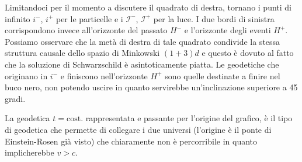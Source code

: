 Limitandoci per il momento a discutere il quadrato di destra, tornano i punti di infinito $i^-$, $i^+$ per le particelle e i $\mathcal{I^-}$, $\mathcal{I}^+$ per la luce. I due bordi di sinistra corrispondono invece all'orizzonte del passato $H^-$ e l'orizzonte degli eventi $H^+$. Possiamo osservare che la metà di destra di tale quadrato condivide la stessa struttura causale dello spazio di Minkowski $(1+3)d$ e questo è dovuto al fatto che la soluzione di Schwarzschild è asintoticamente piatta. Le geodetiche che originano in $i^-$ e finiscono nell'orizzonte $H^+$ sono quelle destinate a finire nel buco nero, non potendo uscire in quanto servirebbe un'inclinazione superiore a 45 gradi.

La geodetica $t=\textrm{cost.}$ rappresentata e passante per l'origine del grafico, è il tipo di geodetica che permette di collegare i due universi (l'origine è il ponte di Einstein-Rosen già visto) che chiaramente non è percorribile in quanto implicherebbe $v>c$.

